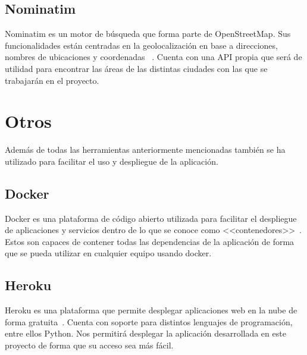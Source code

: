 \subsection{Nominatim}
Nominatim es un motor de búsqueda que forma parte de OpenStreetMap. Sus funcionalidades están centradas en la 
geolocalización en base a direcciones, nombres de ubicaciones y coordenadas ~\cite{nominatimNominatim}. Cuenta con una API propia
que será de utilidad para encontrar las áreas de las distintas ciudades con las que se trabajarán en el proyecto.

\section{Otros}
Además de todas las herramientas anteriormente mencionadas también se ha utilizado para facilitar el uso y despliegue de la aplicación.

\subsection{Docker}
Docker es una plataforma de código abierto utilizada para facilitar el despliegue de aplicaciones y servicios dentro de lo que se conoce como <<contenedores>>~\cite{dockerContainer}. Estos son capaces de contener todas las dependencias de la aplicación de forma que se pueda utilizar en cualquier equipo usando docker.  

\subsection{Heroku}
Heroku es una plataforma que permite desplegar aplicaciones web en la nube de forma gratuita~\cite{herokuWhatHeroku}. Cuenta con soporte para distintos lenguajes de programación, entre ellos Python. Nos permitirá desplegar la aplicación desarrollada en este proyecto de forma que su acceso sea más fácil.
